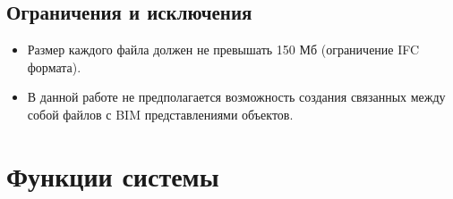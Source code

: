 \documentclass[a4paper,14pt]{extreport} %
\begin{document}
\subsection{Ограничения и исключения}

\begin{itemize}
\item Размер каждого файла должен не превышать 150 Мб (ограничение IFC формата).
\item В данной работе не предполагается возможность создания связанных между собой файлов с BIM представлениями объектов.
\end {itemize}

\newpage

\section{Функции системы}
\end{document}
